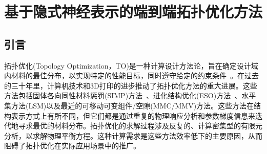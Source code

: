 
\chapter{基于隐式神经表示的端到端拓扑优化方法}

\section{引言}
拓扑优化(Topology Optimization，TO)是一种计算设计方法论，旨在确定设计域内材料的最佳分布，以实现特定的性能目标，同时遵守给定的约束条件~\cite{sigmund2013}。在过去的三十年里，计算机技术和3D打印的进步推动了拓扑优化方法的重大进展。这些方法包括固体各向同性材料惩罚(SIMP)方法~\cite{bendsoe1999}、进化结构优化(ESO)方法~\cite{xie1993}、水平集方法(LSM)\cite{wang2003level}以及最近的可移动可变组件/空隙(MMC/MMV)方法\cite{guo2014doing,zhang2017explicit}。这些方法在结构表示方式上有所不同，但它们都是通过重复的物理响应分析和参数梯度信息来迭代地寻求最优的材料分布。拓扑优化的求解过程涉及反复的、计算密集型的有限元分析，以求解物理平衡方程。这种计算需求是这些方法效率低下的主要原因，从而阻碍了拓扑优化在实际应用场景中的推广。